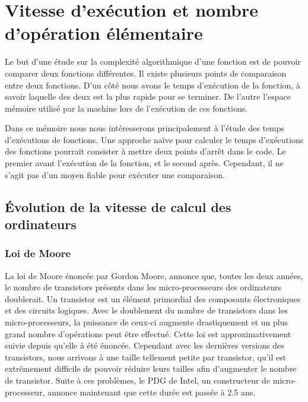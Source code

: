 \documentclass[12pt, twoside, openright]{report}
\begin{document}
\section{Vitesse d'exécution et nombre d'opération élémentaire}

Le but d'une étude sur la complexité algorithmique d'une fonction est de pouvoir comparer deux fonctions différentes. Il existe plusieurs points de comparaison entre deux fonctions. D'un côté nous avons le temps d'exécution de la fonction, à savoir laquelle des deux est la plus rapide pour se terminer. De l'autre l'espace mémoire utilisé par la machine lors de l'exécution de ces fonctions. 

Dans ce mémoire nous nous intéresserons principalement à l'étude des temps d'exécutions de fonctions. Une approche naïve pour calculer le temps d'exécutions des fonctions pourrait consister à mettre deux points d'arrêt dans le code. Le premier avant l'exécution de la fonction, et le second après. Cependant, il ne s'agit pas d'un moyen fiable pour exécuter une comparaison. 

\subsection{Évolution de la vitesse de calcul des ordinateurs}

\subsubsection{Loi de Moore}

La loi de Moore énoncée par Gordon Moore, annonce que, toutes les deux années, le nombre de transistors présents dans les micro-processeurs des ordinateurs doublerait. Un transistor est un élément primordial des composants électroniques et des circuits logiques. Avec le doublement du nombre de transistors dans les micro-processeurs, la puissance de ceux-ci augmente drastiquement et un plus grand nombre d'opérations peut être effectué. Cette loi est approximativement suivie depuis qu'elle à été énoncée. Cependant avec les dernières versions des transistors, nous arrivons à une taille tellement petite par transistor, qu'il est extrêmement difficile de pouvoir réduire leurs tailles afin d'augmenter le nombre de transistor. Suite à ces problèmes, le PDG de Intel, un constructeur de micro-processeur, annonce maintenant que cette durée est passée à 2.5 ans.\cite{moore01} 
\end{document}
